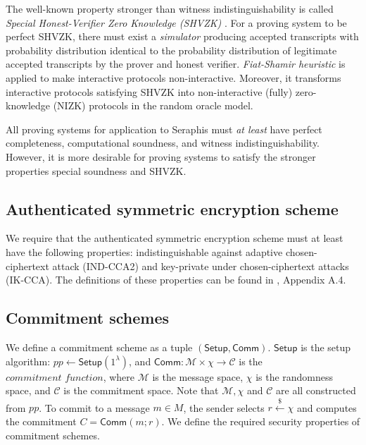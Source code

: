 \documentclass{article}
\theoremstyle{plain}
\theoremstyle{remark}
\begin{document}
The well-known property stronger than witness indistinguishability is called \textit{Special Honest-Verifier Zero Knowledge (SHVZK)} \cite{groth}. For a proving system to be perfect SHVZK, there must exist a \textit{simulator} producing accepted transcripts with probability distribution identical to the probability distribution of legitimate accepted transcripts by the prover and honest verifier. \textit{Fiat-Shamir heuristic} is applied to make interactive protocols non-interactive. Moreover, it transforms interactive protocols satisfying SHVZK into non-interactive (fully) zero-knowledge (NIZK) protocols in the random oracle model.

All proving systems for application to Seraphis must \textit{at least} have perfect completeness,  computational soundness, and witness indistinguishability. However, it is more desirable for proving systems to satisfy the stronger properties special soundness and SHVZK.

\subsection{Authenticated symmetric encryption scheme}\label{sec-symm}
We require that the authenticated symmetric encryption scheme must at least have the following properties: indistinguishable against adaptive chosen-ciphertext attack (IND-CCA2) and key-private under chosen-ciphertext attacks (IK-CCA). The definitions of these properties can be found in \cite{omniring}, Appendix A.4.

\subsection{Commitment schemes}\label{comm}
We define a commitment scheme as a tuple $(\textsf{Setup}, \textsf{Comm})$. $\textsf{Setup}$ is the setup algorithm: $pp\leftarrow\textsf{Setup}(1^{\lambda})$, and $\textsf{Comm}:\mathcal{M}\times{\chi}\rightarrow\mathcal{C}$ is the $\textit{commitment function}$, where $\mathcal{M}$ is the message space, $\chi$ is the randomness space, and $\mathcal{C}$ is the commitment space. Note that $\mathcal{M}, \chi$ and $\mathcal{C}$ are all constructed from $pp$.
To commit to a message $m \in M$, the sender selects $r\xleftarrow{\$}\chi$ and computes the commitment $C = \textsf{Comm}(m; r)$. We define the required security properties of commitment schemes.
\end{document}
